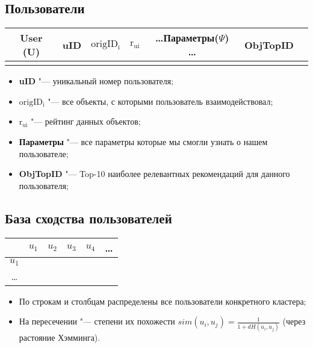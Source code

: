 \documentclass[a4paper,14pt]{article}
\begin{document}
\subsection{Пользователи} \label{users}
\begin{center}
\begin{tabular}[t]{|c|c|c|c|c|c|c|}
\hline
 User (U) & uID & $\mathrm{origID_i}$ & $\mathrm{r_{ui}}$ & \dots Параметры($\Psi$) \dots & ObjTopID \\
\hline  
 &  &  & & &  \\ 
\end{tabular}
\end{center}
\begin{itemize}
\item {\bf uID} "--- уникальный номер пользователя;
\item {\bf $\mathrm{origID_i}$} "--- все объекты, с которыми пользователь взаимодействовал; 
\item {\bf $\mathrm{r_{ui}}$} "--- рейтинг данных объектов;
\item {\bf Параметры} "--- все параметры которые мы смогли узнать о нашем пользователе;
\item {\bf ObjTopID} "--- Top-10 наиболее релевантных рекомендаций для данного пользователя;
\end{itemize}

\subsection{База сходства пользователей}
\begin{center}
\begin{tabular}[t]{|c|c|c|c|c|c|}
\hline
    & $u_1$ & $u_2$ & $u_3$ & $u_4$ & \dots  \\
\hline  
$u_1$ &  &  &  &  &   \\  
 \hline
\dots &  &  &  &  &   \\ 
 \hline
\end{tabular}
\end{center}
\begin{itemize}
\item По строкам и столбцам распределены все пользователи конкретного кластера;
\item На пересечении "--- степени их похожести $sim(u_i,u_j) = \frac{1}{1+dH\left(u_i,u_j\right)}$ (через растояние Хэмминга).
\end{itemize}
\end{document}
